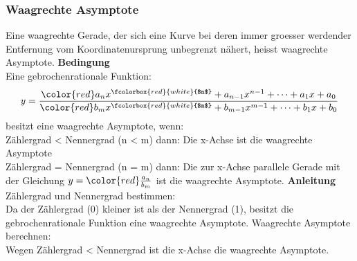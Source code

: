 \begin{multicols}{3}
        \subsubsection*{Waagrechte Asymptote}
        Eine waagrechte Gerade, der sich eine Kurve bei deren immer groesser werdender Entfernung vom Koordinatenursprung unbegrenzt nähert, heisst waagrechte Asymptote.
        \textbf{Bedingung}\\
        Eine gebrochenrationale Funktion:
        \[y = \frac{{\color{red}a_n} x^{\fcolorbox{red}{white}{$n$}} + a_{n-1} x^{n-1} + \dots + a_1 x + a_ 0}{{\color{red}b_m} x^{\fcolorbox{red}{white}{$m$}} + b_{m-1} x^{m-1} + \dots + b_1 x + b_ 0}\]
        besitzt eine waagrechte Asymptote, wenn: \\
        Zählergrad < Nennergrad (n < m) dann: Die x-Achse ist die waagrechte Asymptote \\
        Zählergrad = Nennergrad (n = m) dann:  Die zur x-Achse parallele Gerade mit der Gleichung $y = {\color{red}\frac{a_n}{b_m}}$ ist die waagrechte Asymptote.
        \textbf{Anleitung}\\
        Zählergrad und Nennergrad bestimmen: \\
        Da der Zählergrad (0) kleiner ist als der Nennergrad (1), besitzt die gebrochenrationale Funktion eine waagrechte Asymptote.
        Waagrechte Asymptote berechnen: \\
        Wegen Zählergrad < Nennergrad ist die x-Achse die waagrechte Asymptote.
        \\
    \normalsize
    

    \newpage
\end{multicols}